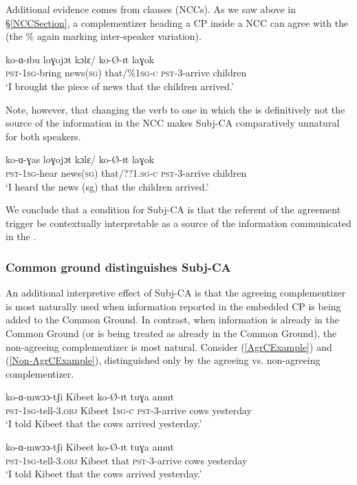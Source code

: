 \documentclass[output=paper
,newtxmath
,modfonts
,nonflat]{langsci/langscibook}
\begin{document}
Additional evidence comes from  clauses (NCCs). As we saw above in \S \ref{NCCSection}, a complementizer heading a CP inside a NCC can agree with the   (the \% again marking inter-speaker variation). 

\ea
\gll ko-ɑ-ɪbu loɣojɔt kɔlɛ/ ko-\O-ɪt laɣok \\
\textsc{pst}-1\textsc{sg}-bring news(\textsc{sg}) that/\%1\textsc{sg-c} \textsc{pst}-3-arrive children \\
\glt `I brought the piece of news that the children arrived.'
\z

\noindent Note, however, that changing the verb to one in which the  is definitively not the source of the information in the NCC makes Subj-CA comparatively unnatural for both speakers. 

\ea
\gll ko-ɑ-ɣas loɣojɔt kɔlɛ/ ko-\O-ɪt laɣok \\
\textsc{pst}-1\textsc{sg}-hear news(\textsc{sg}) that/??1.\textsc{sg-c} \textsc{pst}-3-arrive children \\
\glt `I heard the news (sg) that the children arrived.'
\z

\noindent We conclude that a condition for Subj-CA is that the referent of the agreement trigger be contextually interpretable as a source of the information communicated in the . 

\subsubsection{Common ground distinguishes Subj-CA}

An additional interpretive effect of Subj-CA is that the agreeing complementizer is most naturally used when information reported in the embedded CP is being added to the Common Ground. In contrast, when information is already in the Common Ground (or is being treated as already in the Common Ground), the non-agreeing complementizer is most natural. Consider (\ref{AgrCExample}) and (\ref{Non-AgrCExample}), distinguished only by the agreeing vs. non-agreeing complementizer. 

\ea
\settowidth{}
\begin{xlist}

\ex \label{AgrCExample}
\gll ko-ɑ-mwɔɔ-tʃi Kibeet  ko-\O-ɪt tuɣa amut \\ 
\textsc{pst}-1\textsc{sg}-tell-3.\textsc{obj} Kibeet 1\textsc{sg-c} \textsc{pst}-3-arrive cows yesterday \\ %
\glt `I told Kibeet that the cows arrived yesterday.'

\ex \label{Non-AgrCExample}
\gll ko-ɑ-mwɔɔ-tʃi Kibeet  ko-\O-ɪt tuɣa amut \\ 
\textsc{pst}-1\textsc{sg}-tell-3.\textsc{obj} Kibeet that \textsc{pst}-3-arrive cows yesterday \\ %
\glt `I told Kibeet that the cows arrived yesterday.'

\end{xlist}
\z
\end{document}

